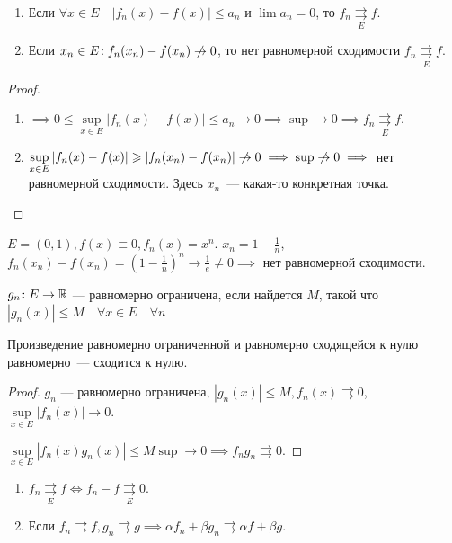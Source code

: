 \begin{consequence}
\begin{enumerate}
    \item Если $\forall x \in E\quad |f_n(x) - f(x)| \le a_n$ и $\lim a_n = 0$, то $f_n \underset{E}{\rightrightarrows} f$.
    \item Если  $x_n \in E\!: f_n(x_n) - f(x_n) \centernot \to 0$, то нет равномерной сходимости  $f_n \underset{E}{\rightrightarrows} f$.
\end{enumerate}
\end{consequence}
\begin{proof}
    \begin{enumerate}
        \item $\implies 0 \le \sup\limits_{x \in E} |f_n(x) - f(x)| \le a_n \to 0 \implies \sup \to 0 \implies f_n \underset{E}{\rightrightarrows}f$.
        \item $\sup\limits_{x \in E} |f_n(x) - f(x)| \ge |f_n(x_n)  - f(x_n)| \centernot \to 0 \implies \sup \centernot \to 0 \implies$ нет равномерной сходимости. Здесь $x_n$~--- какая-то конкретная точка.
    \end{enumerate}
\end{proof}
\begin{example}
    $E=(0, 1), f(x) \equiv 0, f_n(x) = x^n$. $x_n = 1 - \frac{1}{n}$, $f_n(x_n) - f(x_n) = \left(1-\frac{1}{n}\right)^n \to \frac{1}{e} \neq 0 \implies$ нет равномерной сходимости.
\end{example}
\begin{definition}
    $g_n \!: E \to \mathbb{R}$ --- равномерно ограничена, если найдется  $M$, такой что\\$|g_n(x)| \le M \quad \forall x \in E\quad\forall n$
\end{definition}
\begin{statement}
    Произведение равномерно ограниченной и равномерно сходящейся к нулю равномерно~--- сходится к нулю.
\end{statement}
\begin{proof}
    $g_n$ --- равномерно ограничена,  $|g_n(x)| \le M, f_n(x) \rightrightarrows 0$, $\sup\limits_{x \in E} |f_n(x)| \to 0$.

     $\sup\limits_{x \in E} |f_n(x)g_n(x)| \le M \sup \to 0 \implies f_ng_n \rightrightarrows 0$.
\end{proof}
\begin{remark}
    \begin{enumerate}
        \item $f_n \underset{E}{\rightrightarrows} f \iff f_n - f \underset{E}{\rightrightarrows} 0$.
        \item  Если $f_n \rightrightarrows f, g_n \rightrightarrows g \implies \alpha f_n + \beta g_n \rightrightarrows \alpha f + \beta g$.
    \end{enumerate}
\end{remark}
